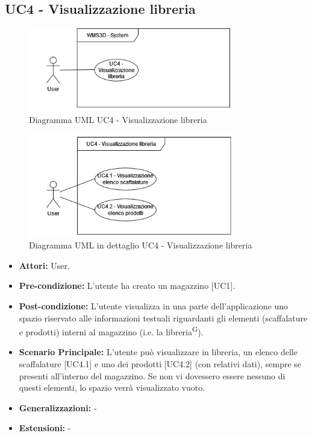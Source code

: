 \subsection{UC4 - Visualizzazione libreria}
\begin{figure}[H]
  \centering
  \includegraphics[width=0.8\textwidth]{UC_diagrams_1-10/UC4_sys.drawio.png}
   \caption{Diagramma UML UC4 - Visualizzazione libreria}
\end{figure}
\begin{figure}[H]
  \centering
  \includegraphics[width=0.8\textwidth]{UC_diagrams_1-10/UC4.drawio.png}
   \caption{Diagramma UML in dettaglio UC4 - Visualizzazione libreria}
\end{figure}
\begin{itemize}
    \item \textbf{Attori:} User.
    \item \textbf{Pre-condizione:}  L'utente ha creato un magazzino [UC1].
    \item \textbf{Post-condizione:} L'utente visualizza in una parte dell'applicazione uno spazio riservato alle informazioni testuali riguardanti gli elementi (scaffalature e prodotti) interni al magazzino (i.e. la libreria\textsuperscript{G}).
    \item \textbf{Scenario Principale:}  L'utente può visualizzare in libreria, un elenco delle scaffalature [UC4.1] e uno dei prodotti [UC4.2] (con relativi dati), sempre se presenti all'interno del magazzino. Se non vi dovessero essere nessuno di questi elementi, lo spazio verrà visualizzato vuoto.
    \item \textbf{Generalizzazioni:} -
    \item \textbf{Estensioni:} -
\end{itemize}



